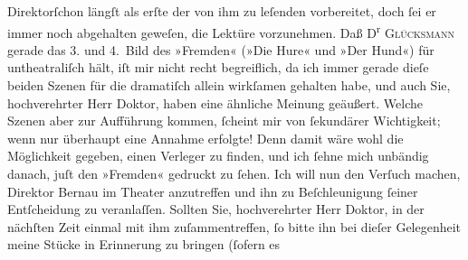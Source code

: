 \begin{ledgroupsized}[t]{13cm}
                  Direktorſchon längſt als erſte der von ihm zu leſenden
               vorbereitet, doch ſei er immer noch abgehalten geweſen, die Lektüre vorzunehmen.\pend
           \pstart
           Daß D\textsuperscript{r}{ }\textsc{Glücksmann} gerade das 3. und 4. Bild des »Fremden«
                  (»Die Hure« und »Der Hund«) für untheatraliſch
               hält, iſt mir nicht recht begreiflich, da ich immer gerade dieſe beiden Szenen für
               die dramatiſch allein wirkſamen gehalten habe, und auch Sie, hochverehrter Herr
               Doktor, haben eine ähnliche Meinung geäußert.\pend
           \pstart
           Welche Szenen aber zur Aufführung kommen, ſcheint mir von ſekundärer Wichtigkeit;
               wenn nur überhaupt eine Annahme erfolgte! Denn damit wäre wohl die Möglichkeit
               gegeben, einen Verleger zu finden, und ich ſehne mich unbändig danach, juſt den »Fremden« gedruckt zu ſehen.\pend
           \pstart
           Ich will nun den Verſuch machen, Direktor Bernau im Theater anzu{\pb}treffen
               und ihn zu Beſchleunigung ſeiner Entſcheidung zu veranlaſſen. Sollten Sie,
               hochverehrter Herr Doktor, in der nächſten Zeit einmal mit ihm zuſammentreffen, ſo
               bitte ihn bei dieſer Gelegenheit meine Stücke in Erinnerung zu bringen (ſofern es

\end{ledgroupsized}
